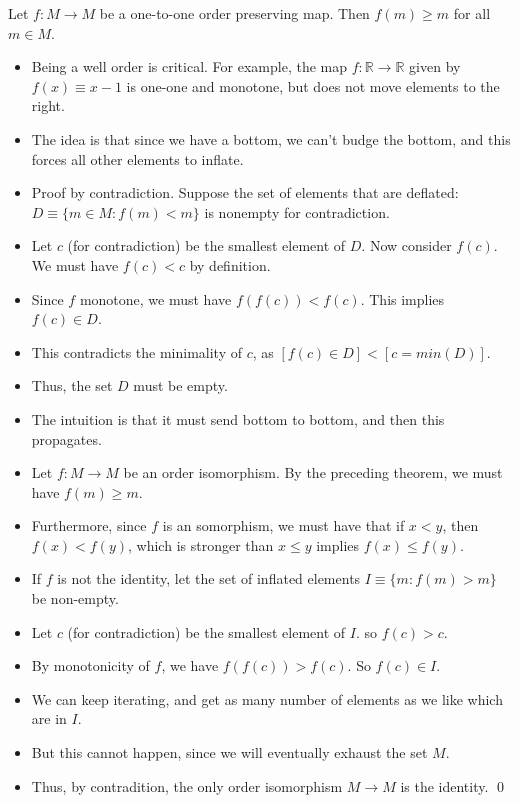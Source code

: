 \documentclass{article}
\begin{document}
 Let $f: M \rightarrow M$ be a one-to-one order preserving map. Then $f(m) \geq m$ for all $m \in M$.
\begin{itemize}
    \item Being a well order is critical. For example, the map $f: \mathbb R \to \mathbb R $ given by $f(x) \equiv x - 1$ is one-one and monotone, but does not
        move elements to the right.
    \item The idea is that since we have a bottom, we can't budge the bottom, and this forces all other elements to inflate.
    \item Proof by contradiction. Suppose the set of elements that are deflated: $D \equiv \{ m \in M : f(m) < m \}$ is nonempty for contradiction.
    \item Let $c$ (for contradiction) be the smallest element of $D$. Now consider $f(c)$. We must have $f(c) < c$ by definition.
    \item Since $f$ monotone, we must have  $f(f(c)) < f(c)$. This implies $f(c) \in D$.
    \item This contradicts the minimality of $c$, as $[f(c) \in D] < [c = min(D)]$.
    \item Thus, the set $D$ must be empty.
\end{itemize}

\begin{itemize}
    \item  The intuition is that it must send bottom to bottom, and then this propagates.
    \item Let $f: M \rightarrow M$ be an order isomorphism. By the preceding theorem, we must have $f(m) \geq m$.
    \item Furthermore, since $f$ is an somorphism, we must have that if $x < y$, then $f(x) < f(y)$, which is stronger than $x \leq y$ implies $f(x) \leq f(y)$.
    \item If $f$ is not the identity, let the set of inflated elements $I \equiv \{ m : f(m) > m \}$ be non-empty.
    \item Let $c$ (for contradiction) be the smallest element of $I$. so $f(c) > c$.
    \item By monotonicity of $f$, we have $f(f(c)) > f(c)$. So $f(c) \in I$.
    \item We can keep iterating, and get as many number of elements as we like which are in $I$. 
    \item But this cannot happen, since we will eventually exhaust the set $M$. 
    \item Thus, by contradition, the only order isomorphism $M \rightarrow M$ is the identity. \qed
\end{itemize}
\end{document}
